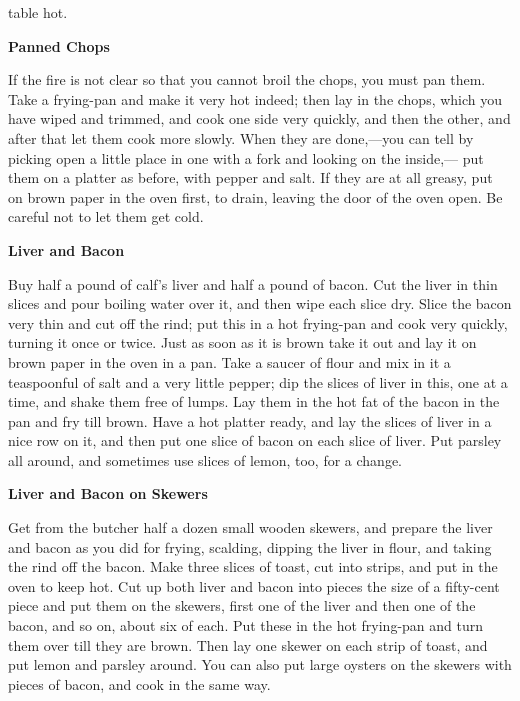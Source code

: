 \documentclass[11pt]{book}
\newcommand{\indpar}{\par\noindent\hspace*{\parindent}}
\newcommand{\instruction}{\indpar}
\newenvironment{RecipeTitle}{\medskip\begin{center}\large\bf }{\end{center}\smallskip}
\begin{document}
table hot.
\begin{RecipeTitle}
Panned Chops\label{panned_chops}
\end{RecipeTitle}
\instruction  If the fire is not clear so that you cannot broil the chops, you
must pan them.  Take a frying-pan and make it very hot indeed; then
lay in the chops, which you have wiped and trimmed, and cook one
side very quickly, and then the other, and after that let them cook
more slowly.  When they are done,---you can tell by picking open
a little place in one with a fork and looking on the inside,---
put them on a platter as before, with pepper and salt.  If they
are at all greasy,  put on brown paper in the oven first, to drain,
leaving the door of the oven open.  Be careful not to let them
get cold.
\begin{RecipeTitle}
Liver and Bacon\label{liver_and_bacon}
\end{RecipeTitle}
\instruction
  Buy half a pound of calf's liver and half a pound of bacon.  Cut
the liver in thin slices and pour boiling water over it, and then
wipe each slice dry.  Slice the bacon very thin and cut off the
rind; put this in a hot frying-pan and cook very quickly, turning
it once or twice.  Just as soon as it is brown take it out and lay
it on brown paper in the oven in a pan.  Take a saucer of flour and
mix in it a teaspoonful of salt and a very little pepper; dip the
slices of liver in this, one at a time, and shake them free of lumps.
Lay them in the hot fat of the bacon in the pan and fry till brown.
Have a hot platter ready, and lay the slices of liver in a nice
row on it, and then put one slice of bacon on each slice of liver.
Put parsley all around, and sometimes use slices of lemon, too,
for a change.
\begin{RecipeTitle}
Liver and Bacon on Skewers\label{liver_and_bacon_on_skewers}
\end{RecipeTitle}
\instruction
  Get from the butcher half a dozen small wooden skewers, and
prepare the liver and bacon as you did for frying, scalding,
dipping the liver in flour, and taking the rind off the bacon.
Make three slices of toast, cut into strips, and put in the oven
to keep hot.  Cut up both liver and bacon into pieces the size
of a fifty-cent piece and put them on the skewers, first one of
the liver and then one of the bacon, and so on, about six of each.
Put these in the hot frying-pan and turn them over till they are
brown.  Then lay one skewer on each strip of toast, and put lemon
and parsley around.  You can also put large oysters on the skewers
with pieces of bacon, and cook in the same way.
\end{document}
